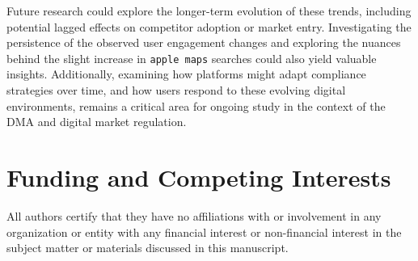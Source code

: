 \documentclass[11pt]{article}
\begin{document}
	Future research could explore the longer-term evolution of these trends, including potential lagged effects on competitor adoption or market entry. Investigating the persistence of the observed user engagement changes and exploring the nuances behind the slight increase in \texttt{apple maps} searches could also yield valuable insights. Additionally, examining how platforms might adapt compliance strategies over time, and how users respond to these evolving digital environments, remains a critical area for ongoing study in the context of the DMA and digital market regulation.
	
	
	
	
	\section*{Funding and Competing Interests}
	
	All authors certify that they have no affiliations with or involvement in any organization or entity with any financial interest or non-financial interest in the subject matter or materials discussed in this manuscript.
	
	
	
	
	
	
\end{document}
